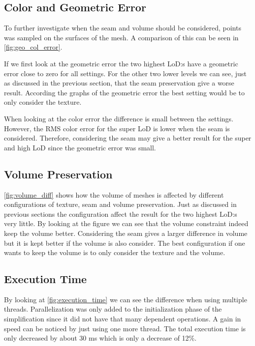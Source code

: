 \subsection{Color and Geometric Error} \label{sec:discussion_color_geom}
To further investigate when the seam and volume should be considered, points was sampled on the surfaces of the mesh. A comparison of this can be seen in \cref{fig:geo_col_error}.

If we first look at the geometric error the two highest LoD:s have a geometric error close to zero for all settings. For the other two lower levels we can see, just as discussed in the previous section, that the seam preservation give a worse result. According the graphs of the geometric error the best setting would be to only consider the texture.

When looking at the color error the difference is small between the settings. However, the RMS color error for the super LoD is lower when the seam is considered. Therefore, considering the seam may give a better result for the super and high LoD since the geometric error was small.

\subsection{Volume Preservation} \label{sec:discussion_volume}
\cref{fig:volume_diff} shows how the volume of meshes is affected by different configurations of texture, seam and volume preservation. Just as discussed in previous sections the configuration affect the result for the two highest LoD:s very little. By looking at the figure we can see that the volume constraint indeed keep the volume better. Considering the seam gives a larger difference in volume but it is kept better if the volume is also consider. The best configuration if one wants to keep the volume is to only consider the texture and the volume.

\subsection{Execution Time} \label{sec:discussion_time}
By looking at \cref{fig:execution_time} we can see the difference when using multiple threads. Parallelization was only added to the initialization phase of the simplification since it did not have that many dependent operations. A gain in speed can be noticed by just using one more thread. The total execution time is only decreased by about 30 ms which is only a decrease of 12\%.

